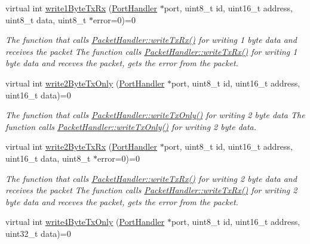 \begin{DoxyCompactItemize}
virtual int \hyperlink{classmercury_1_1_packet_handler_a23576f2a57fb0bb66797b8a3a1935cd1}{write1\+Byte\+Tx\+Rx} (\hyperlink{classmercury_1_1_port_handler}{Port\+Handler} $\ast$port, uint8\+\_\+t id, uint16\+\_\+t address, uint8\+\_\+t data, uint8\+\_\+t $\ast$error=0)=0
\begin{DoxyCompactList}\small\item\em The function that calls \hyperlink{classmercury_1_1_packet_handler_adf35a5000d465bd5426530e34a91a21d}{Packet\+Handler\+::write\+Tx\+Rx()} for writing 1 byte data and receives the packet  The function calls \hyperlink{classmercury_1_1_packet_handler_adf35a5000d465bd5426530e34a91a21d}{Packet\+Handler\+::write\+Tx\+Rx()} for writing 1 byte data and receves the packet,  gets the error from the packet. \end{DoxyCompactList}\item 
virtual int \hyperlink{classmercury_1_1_packet_handler_a417e5e07c5592d3dc524da4b4c829fb4}{write2\+Byte\+Tx\+Only} (\hyperlink{classmercury_1_1_port_handler}{Port\+Handler} $\ast$port, uint8\+\_\+t id, uint16\+\_\+t address, uint16\+\_\+t data)=0
\begin{DoxyCompactList}\small\item\em The function that calls \hyperlink{classmercury_1_1_packet_handler_acf4e01987186250221603f794e7e4b59}{Packet\+Handler\+::write\+Tx\+Only()} for writing 2 byte data  The function calls \hyperlink{classmercury_1_1_packet_handler_acf4e01987186250221603f794e7e4b59}{Packet\+Handler\+::write\+Tx\+Only()} for writing 2 byte data. \end{DoxyCompactList}\item 
virtual int \hyperlink{classmercury_1_1_packet_handler_a5beac405c8ea75cc82ea5c01867a45db}{write2\+Byte\+Tx\+Rx} (\hyperlink{classmercury_1_1_port_handler}{Port\+Handler} $\ast$port, uint8\+\_\+t id, uint16\+\_\+t address, uint16\+\_\+t data, uint8\+\_\+t $\ast$error=0)=0
\begin{DoxyCompactList}\small\item\em The function that calls \hyperlink{classmercury_1_1_packet_handler_adf35a5000d465bd5426530e34a91a21d}{Packet\+Handler\+::write\+Tx\+Rx()} for writing 2 byte data and receives the packet  The function calls \hyperlink{classmercury_1_1_packet_handler_adf35a5000d465bd5426530e34a91a21d}{Packet\+Handler\+::write\+Tx\+Rx()} for writing 2 byte data and receves the packet,  gets the error from the packet. \end{DoxyCompactList}\item 
virtual int \hyperlink{classmercury_1_1_packet_handler_adf97e077894f1e01f53b7468e4470c19}{write4\+Byte\+Tx\+Only} (\hyperlink{classmercury_1_1_port_handler}{Port\+Handler} $\ast$port, uint8\+\_\+t id, uint16\+\_\+t address, uint32\+\_\+t data)=0

\end{DoxyCompactItemize}
